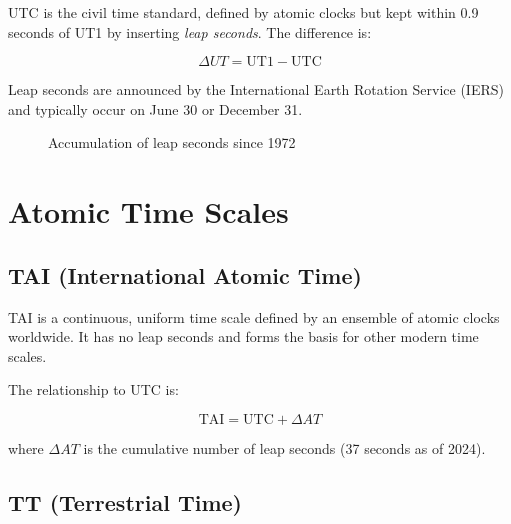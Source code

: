 UTC is the civil time standard, defined by atomic clocks but kept within 0.9 seconds of UT1 by inserting \textit{leap seconds}. The difference is:

\begin{equation}
\Delta UT = \text{UT1} - \text{UTC}
\end{equation}

Leap seconds are announced by the International Earth Rotation Service (IERS) and typically occur on June 30 or December 31.

\begin{figure}[H]
\centering
{}
\caption{Accumulation of leap seconds since 1972}
\label{fig:leapseconds}
\end{figure}

\section{Atomic Time Scales}

\subsection{TAI (International Atomic Time)}

TAI is a continuous, uniform time scale defined by an ensemble of atomic clocks worldwide. It has no leap seconds and forms the basis for other modern time scales.

The relationship to UTC is:

\begin{equation}
\text{TAI} = \text{UTC} + \Delta AT
\end{equation}

where $\Delta AT$ is the cumulative number of leap seconds (37 seconds as of 2024).

\subsection{TT (Terrestrial Time)}

